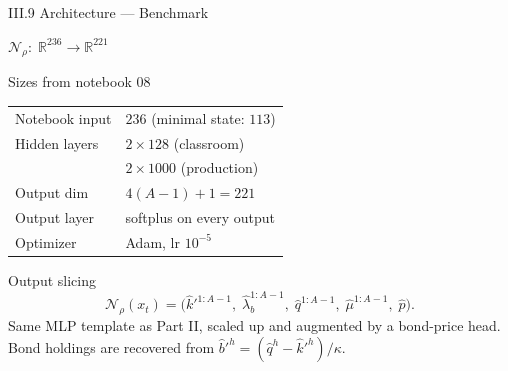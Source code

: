 \documentclass[aspectratio=169,11pt]{beamer}
\newcommand{\R}{\mathbb{R}}
\newcommand{\N}{\mathcal{N}}
\begin{document}
\begin{frame}{III.9 Architecture --- Benchmark}
\scriptsize
\begin{center}
$\N_\rho:\;\R^{236} \to \R^{221}$
\end{center}
\vspace{-4pt}

\begin{block}{Sizes from notebook 08}
\centering
\begin{tabular}{ll}
\toprule
Notebook input   & $236$ (minimal state: $113$) \\
Hidden layers    & $2 \times 128$ (classroom) \\
                 & $2 \times 1000$ (production) \\
Output dim       & $4(A{-}1) + 1 = 221$ \\
Output layer     & softplus on every output \\
Optimizer        & Adam, lr $10^{-5}$\\
\bottomrule
\end{tabular}
\end{block}

\vspace{-3pt}
\begin{exampleblock}{Output slicing}
\vspace{-6pt}
\[
\N_\rho(x_t)
=
\bigl(\hat k'^{1:A-1},\;\hat\lambda_b^{1:A-1},\;\hat q^{1:A-1},\;\hat\mu^{1:A-1},\;\hat p\bigr).
\]
\vspace{-9pt}
Same MLP template as Part II, scaled up and augmented by a bond-price head.  Bond holdings are recovered from $\hat b'^h=(\hat q^h-\hat k'^h)/\kappa$.
\end{exampleblock}
\end{frame}
\end{document}
